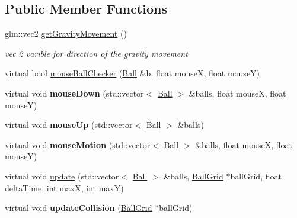 \subsection*{Public Member Functions}
\begin{DoxyCompactItemize}
\item 
\hypertarget{classColorTransferControl_a446d087e090cb13cefdffb89e8c409e3}{
glm::vec2 \hyperlink{classColorTransferControl_a446d087e090cb13cefdffb89e8c409e3}{getGravityMovement} ()}
\label{classColorTransferControl_a446d087e090cb13cefdffb89e8c409e3}

\begin{DoxyCompactList}\small\item\em vec 2 varible for direction of the gravity movement \item\end{DoxyCompactList}\item 
virtual bool \hyperlink{classColorTransferControl_a9bce863f9d08a2dd596a56a432861559}{mouseBallChecker} (\hyperlink{structBall}{Ball} \&b, float mouseX, float mouseY)
\item 
\hypertarget{classColorTransferControl_abac3a089bfe8d05916392cd7dd6807e3}{
virtual void {\bfseries mouseDown} (std::vector$<$ \hyperlink{structBall}{Ball} $>$ \&balls, float mouseX, float mouseY)}
\label{classColorTransferControl_abac3a089bfe8d05916392cd7dd6807e3}

\item 
\hypertarget{classColorTransferControl_a84e96588725965ae2e92b35c22f4a629}{
virtual void {\bfseries mouseUp} (std::vector$<$ \hyperlink{structBall}{Ball} $>$ \&balls)}
\label{classColorTransferControl_a84e96588725965ae2e92b35c22f4a629}

\item 
\hypertarget{classColorTransferControl_a77c38be1e1f33b81f1c4a3f82d671623}{
virtual void {\bfseries mouseMotion} (std::vector$<$ \hyperlink{structBall}{Ball} $>$ \&balls, float mouseX, float mouseY)}
\label{classColorTransferControl_a77c38be1e1f33b81f1c4a3f82d671623}

\item 
virtual void \hyperlink{classColorTransferControl_acbe9581f0be7624c9bc33d40e2ee1a6b}{update} (std::vector$<$ \hyperlink{structBall}{Ball} $>$ \&balls, \hyperlink{classBallGrid}{BallGrid} $\ast$ballGrid, float deltaTime, int maxX, int maxY)
\item 
\hypertarget{classColorTransferControl_aa8608d2417309f4d3a09e1b613060249}{
virtual void {\bfseries updateCollision} (\hyperlink{classBallGrid}{BallGrid} $\ast$ballGrid)}
\label{classColorTransferControl_aa8608d2417309f4d3a09e1b613060249}


\end{DoxyCompactItemize}
